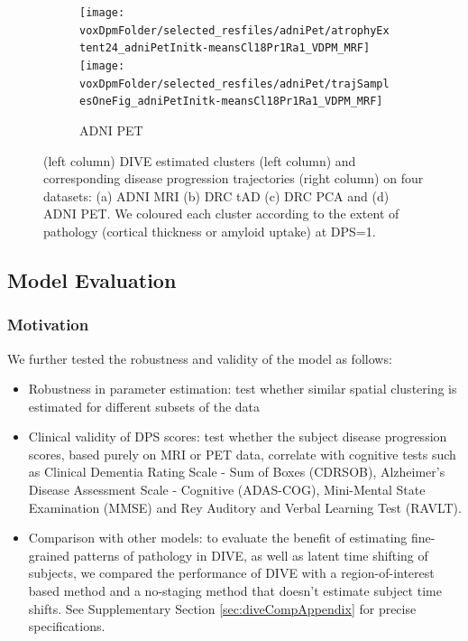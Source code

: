 \begin{figure}
  \begin{subfigure}[b]{\textwidth}
   \centering
  \texttt{[image: \\voxDpmFolder/selected\_resfiles/adniPet/atrophyExtent24\_adniPetInitk-meansCl18Pr1Ra1\_VDPM\_MRF]} \texttt{[image: \\voxDpmFolder/selected\_resfiles/adniPet/trajSamplesOneFig\_adniPetInitk-meansCl18Pr1Ra1\_VDPM\_MRF]}
    \caption{ADNI PET}
    \label{diveClustAdniPet}
  \end{subfigure}
  

  \caption[DIVE Results on ADNI and DRC cohorts]{(left column) DIVE estimated clusters (left column) and corresponding disease progression trajectories (right column) on four datasets: (a) ADNI MRI (b) DRC tAD (c) DRC PCA and (d) ADNI PET. We coloured each cluster according to the extent of pathology (cortical thickness or amyloid uptake) at DPS=1.}
  \label{diveClustTrajAll}
\end{figure}


\subsection{Model Evaluation}
\label{sec:diveEval}

\subsubsection{Motivation}
\label{sec:diveEvalMotiv}

We further tested the robustness and validity of the model as follows: 
\begin{itemize}
 \item Robustness in parameter estimation: test whether similar spatial clustering is estimated for different subsets of the data
 \item Clinical validity of DPS scores: test whether the subject disease progression scores, based purely on MRI or PET data, correlate with cognitive tests such as Clinical Dementia Rating Scale - Sum of Boxes (CDRSOB), Alzheimer's Disease Assessment Scale - Cognitive (ADAS-COG), Mini-Mental State Examination (MMSE) and Rey Auditory and Verbal Learning Test (RAVLT).
 \item Comparison with other models: to evaluate the benefit of estimating fine-grained patterns of pathology in DIVE, as well as latent time shifting of subjects, we compared the performance of DIVE with a region-of-interest based method \cite{jedynak2012computational} and a no-staging method that doesn't estimate subject time shifts. See Supplementary Section \ref{sec:diveCompAppendix} for precise specifications.
\end{itemize}


